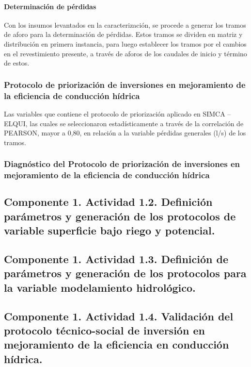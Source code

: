 \documentclass[]{article}
\begin{document}
\paragraph{Determinación de pérdidas}


Con los insumos levantados en la caracterización, se procede a generar los tramos de aforo para la determinación de pérdidas. Estos tramos se dividen en matriz y distribución en primera instancia, para luego establecer los tramos por el cambios en el revestimiento presente, a través de aforos de los caudales de inicio y término de estos.



\subsubsection{Protocolo de priorización de inversiones en mejoramiento de la eficiencia de conducción hídrica}

Las variables que contiene el protocolo de priorización aplicado en SIMCA – ELQUI, las cuales se seleccionaron estadísticamente a través de la correlación de PEARSON, mayor a 0,80, en relación a la variable pérdidas generales (l/s) de los tramos.

\subsubsection{Diagnóstico del Protocolo de priorización de inversiones en mejoramiento de la eficiencia de conducción hídrica}



\subsection{Componente 1. Actividad 1.2. Definición parámetros y generación de los protocolos de variable superficie bajo riego y potencial.}

\subsection{Componente 1. Actividad 1.3. Definición de parámetros y generación de los protocolos para la variable modelamiento hidrológico.}


\subsection{Componente 1. Actividad 1.4. Validación del protocolo técnico-social de inversión en mejoramiento de la eficiencia en conducción hídrica.}
\end{document}
